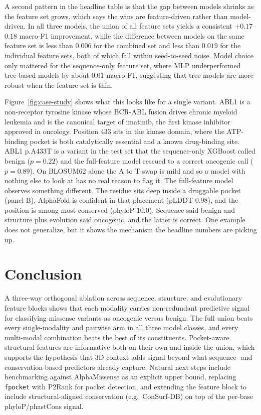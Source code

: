 \documentclass{article}
\begin{document}
A second pattern in the headline table is that the gap between models
shrinks as the feature set grows, which says the wins are feature-driven
rather than model-driven. In all
three models, the union of all feature sets yields a consistent
$+0.17$--$0.18$ macro-F1 improvement, while the difference between
models on the same feature set is less than $0.006$ for the combined
set and less than $0.019$ for the individual feature sets, both of
which fall within seed-to-seed noise. Model choice only mattered for
the sequence-only feature set, where MLP underperformed tree-based
models by about $0.01$ macro-F1, suggesting that tree models are more robust
when the feature set is thin.

Figure~\ref{fig:case-study} shows what this looks like for a single
variant. ABL1 is a non-receptor tyrosine kinase whose BCR-ABL fusion
drives chronic myeloid leukemia and is the canonical target of
imatinib, the first kinase inhibitor approved in oncology. Position
433 sits in the kinase domain, where the ATP-binding pocket is both
catalytically essential and a known drug-binding site. ABL1 p.A433T
is a variant in the test set that the sequence-only XGBoost called benign
($p = 0.22$) and the full-feature model rescued to a correct oncogenic
call ($p = 0.89$). On BLOSUM62 alone the A to T swap is mild and so a
model with nothing else to look at has no real reason to flag it. The full-feature model observes something different.
The residue sits deep inside a druggable pocket (panel B), AlphaFold
  is confident in that placement (pLDDT $0.98$), and the position is among most conserved (phyloP $10.0$). Sequence said benign and structure plus evolution
said oncogenic, and the latter is correct. One example does
not generalize, but it shows the mechanism the headline numbers are
picking up.

\section{Conclusion}
\label{sec:conclusion}

A three-way orthogonal ablation across sequence, structure, and
evolutionary feature blocks shows that each modality carries
non-redundant predictive signal for classifying missense variants as
oncogenic versus benign. The full union beats every single-modality and
pairwise arm in all three model classes, and every multi-modal
combination beats the best of its constituents. Pocket-aware structural
features are informative both on their own and inside the union, which
supports the hypothesis that 3D context adds signal beyond what
sequence- and conservation-based predictors already capture. Natural next steps include benchmarking against
AlphaMissense as an explicit upper bound, replacing \texttt{fpocket}
with P2Rank for pocket detection, and extending the feature block to
include structural-aligned conservation (e.g.\ ConSurf-DB) on top of
the per-base phyloP/phastCons signal.
\end{document}
